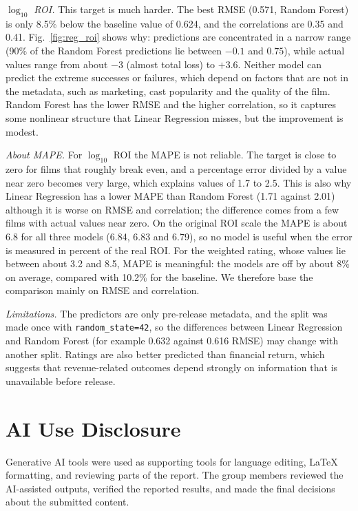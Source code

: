 \documentclass[conference]{IEEEtran}
\begin{document}
\textit{$\log_{10}$ ROI.} This target is much harder. The best RMSE (0.571, Random Forest) is only 8.5\% below the baseline value of 0.624, and the correlations are 0.35 and 0.41. Fig.~\ref{fig:reg_roi} shows why: predictions are concentrated in a narrow range (90\% of the Random Forest predictions lie between $-0.1$ and $0.75$), while actual values range from about $-3$ (almost total loss) to $+3.6$. Neither model can predict the extreme successes or failures, which depend on factors that are not in the metadata, such as marketing, cast popularity and the quality of the film. Random Forest has the lower RMSE and the higher correlation, so it captures some nonlinear structure that Linear Regression misses, but the improvement is modest.
 
\textit{About MAPE.} For $\log_{10}$ ROI the MAPE is not reliable. The target is close to zero for films that roughly break even, and a percentage error divided by a value near zero becomes very large, which explains values of 1.7 to 2.5. This is also why Linear Regression has a lower MAPE than Random Forest (1.71 against 2.01) although it is worse on RMSE and correlation; the difference comes from a few films with actual values near zero. On the original ROI scale the MAPE is about 6.8 for all three models (6.84, 6.83 and 6.79), so no model is useful when the error is measured in percent of the real ROI. For the weighted rating, whose values lie between about 3.2 and 8.5, MAPE is meaningful: the models are off by about 8\% on average, compared with 10.2\% for the baseline. We therefore base the comparison mainly on RMSE and correlation.
 
\textit{Limitations.} The predictors are only pre-release metadata, and the split was made once with \texttt{random\_state=42}, so the differences between Linear Regression and Random Forest (for example 0.632 against 0.616 RMSE) may change with another split. Ratings are also better predicted than financial return, which suggests that revenue-related outcomes depend strongly on information that is unavailable before release.
\clearpage
\raggedbottom
\section*{AI Use Disclosure}
Generative AI tools were used as supporting tools for language editing,
LaTeX formatting, and reviewing parts of the report. The group members
reviewed the AI-assisted outputs, verified the reported results, and
made the final decisions about the submitted content.



\end{document}
